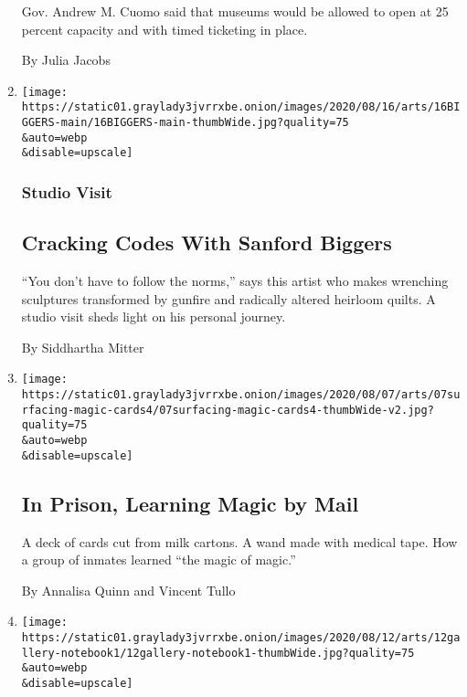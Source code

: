 \begin{enumerate}
  Gov. Andrew M. Cuomo said that museums would be allowed to open at 25
  percent capacity and with timed ticketing in place.

  By Julia Jacobs
\item
  \href{/2020/08/14/arts/design/sanford-biggers-quilt-bronx-museum.html}{}

  \texttt{[image: https://static01.graylady3jvrrxbe.onion/images/2020/08/16/arts/16BIGGERS-main/16BIGGERS-main-thumbWide.jpg?quality=75\\\&auto=webp\\\&disable=upscale]}

  \hypertarget{studio-visit}{%
  \subsubsection{Studio Visit}\label{studio-visit}}

  \hypertarget{cracking-codes-with-sanford-biggers}{%
  \subsection{Cracking Codes With Sanford
  Biggers}\label{cracking-codes-with-sanford-biggers}}

  ``You don't have to follow the norms,'' says this artist who makes
  wrenching sculptures transformed by gunfire and radically altered
  heirloom quilts. A studio visit sheds light on his personal journey.

  By Siddhartha Mitter
\item
  \href{/2020/08/14/arts/magic-prison.html}{}

  \texttt{[image: https://static01.graylady3jvrrxbe.onion/images/2020/08/07/arts/07surfacing-magic-cards4/07surfacing-magic-cards4-thumbWide-v2.jpg?quality=75\\\&auto=webp\\\&disable=upscale]}

  \hypertarget{in-prison-learning-magic-by-mail}{%
  \subsection{In Prison, Learning Magic by
  Mail}\label{in-prison-learning-magic-by-mail}}

  A deck of cards cut from milk cartons. A wand made with medical tape.
  How a group of inmates learned ``the magic of magic.''

  By Annalisa Quinn and Vincent Tullo
\item
  \href{/2020/08/13/arts/design/nyc-galleries-art-shows.html}{}

  \texttt{[image: https://static01.graylady3jvrrxbe.onion/images/2020/08/12/arts/12gallery-notebook1/12gallery-notebook1-thumbWide.jpg?quality=75\\\&auto=webp\\\&disable=upscale]}


\end{enumerate}
